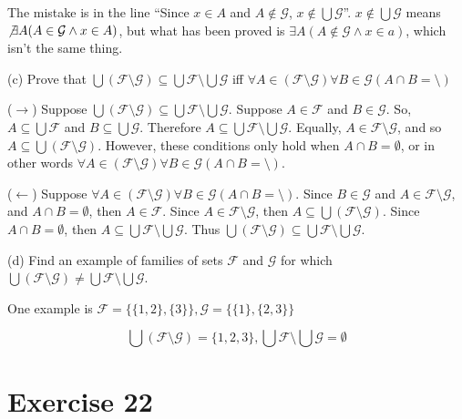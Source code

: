 \documentclass[11pt]{article}
\newcommand{\family}[1]{\mathcal{#1}}
\begin{document}
The mistake is in the line ``Since $x \in A$ and $A \notin \family{G}$,
$x \notin \bigcup \family{G}$''. $x \notin \bigcup \family{G}$ means 
$\not \exists A (A \in \family{G} \wedge x \in A)$, but what has been proved is 
$\exists A (A \notin \family{G} \wedge x \in a)$, which isn't the same thing.

\noindent (c) Prove that
$\bigcup (\family{F} \setminus \family{G}) \subseteq \bigcup \family{F} \setminus \bigcup \family{G}$
iff
$\forall A \in (\family{F} \setminus \family{G}) \forall B \in \family{G} (A \cap B = \setminus)$

($\rightarrow$) Suppose
$\bigcup (\family{F} \setminus \family{G}) \subseteq \bigcup \family{F} \setminus \bigcup \family{G}$.
Suppose $A \in \family{F}$ and $B \in \family{G}$. So, $A \subseteq \bigcup \family{F}$
and $B \subseteq \bigcup \family{G}$. Therefore 
$A \subseteq \bigcup \family{F} \setminus \bigcup \family{G}$. Equally,
$A \in \family{F} \setminus \family{G}$, and so 
$A \subseteq \bigcup (\family{F} \setminus \family{G})$.
However, these conditions only hold when $A \cap B = \emptyset$, or in other words 
$\forall A \in (\family{F} \setminus \family{G}) \forall B \in \family{G} (A \cap B = \setminus)$.

($\leftarrow$) Suppose 
$\forall A \in (\family{F} \setminus \family{G}) \forall B \in \family{G} (A \cap B = \setminus)$.
Since $B \in \family{G}$ and $A \in \family{F} \setminus \family{G}$, and 
$A \cap B = \emptyset$, then $A \in \family{F}$. Since 
$A \in \family{F} \setminus \family{G}$, then 
$A \subseteq \bigcup (\family{F} \setminus \family{G})$. Since $A \cap B = \emptyset$,
then $A \subseteq \bigcup \family{F} \setminus \bigcup \family{G}$.
Thus 
$\bigcup (\family{F} \setminus \family{G}) \subseteq \bigcup \family{F} \setminus \bigcup \family{G}$.

\noindent (d) Find an example of families of sets $\family{F}$ and $\family{G}$
for which 
$\bigcup (\family{F} \setminus \family{G}) \neq \bigcup \family{F} \setminus \bigcup \family{G}$.

One example is 
$
\family{F} = \{ \{ 1,2 \}, \{ 3 \} \}, 
\family{G} = \{ \{ 1 \}, \{ 2, 3 \} \}
$

$$
\bigcup (\family{F} \setminus \family{G}) = \{ 1, 2, 3 \},
\bigcup \family{F} \setminus \bigcup \family{G} = \emptyset
$$

\section*{Exercise 22}
\end{document}
